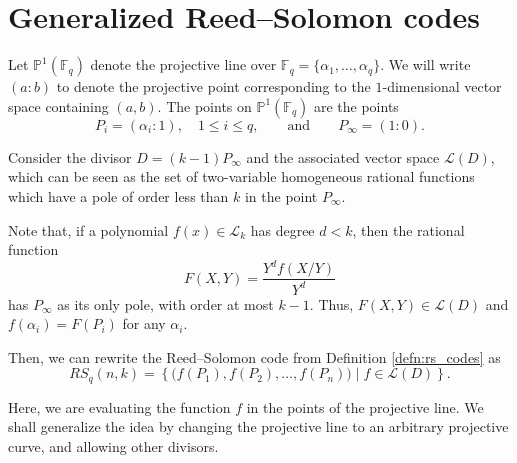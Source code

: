\documentclass[11pt, oneside]{amsart}
\theoremstyle{definition}
\theoremstyle{remark}
\numberwithin{equation}{section}
\begin{document}

\section{Generalized Reed--Solomon codes} \label{s:grs}
Let $\mathbb{P}^1(\mathbb{F}_q)$ denote the projective line over $\mathbb{F}_q = \{\alpha_1, \dots, \alpha_q\}$.
We will write $(a : b)$ to denote the projective point corresponding to the $1$-dimensional vector space containing $(a, b)$.
The points on $\mathbb{P}^1(\mathbb{F}_q)$ are the points
\begin{equation}
	P_i = (\alpha_i : 1), \quad 1 \le i \le q, \qquad \text{and} \qquad 
	P_\infty = (1 : 0).
\end{equation}

Consider the divisor $D = (k-1)P_\infty$ and the associated vector space $\mathcal L(D)$, which can be seen as the set of two-variable homogeneous rational functions which have a pole of order less than $k$ in the point $P_\infty$.

Note that, if a polynomial $f(x) \in \mathcal L_k$ has degree $d < k$, then the rational function \[
	F(X, Y) = \frac{Y^d f(X/Y)}{Y^d}
\]
has $P_\infty$ as its only pole, with order at most $k-1$. Thus, $F(X, Y) \in \mathcal L(D)$ and $f(\alpha_i) = F(P_i)$ for any $\alpha_i$.

Then, we can rewrite the Reed--Solomon code from Definition \ref{defn:rs_codes} as
\begin{equation}
	RS_q(n, k) = \left\{\big(f(P_1), f(P_2), \dots, f(P_n)\big) \mid f \in \mathcal L(D)\right\}.
\end{equation}

Here, we are evaluating the function $f$ in the points of the projective line.
We shall generalize the idea by changing the projective line to an arbitrary projective curve, and allowing other divisors.
\end{document}
